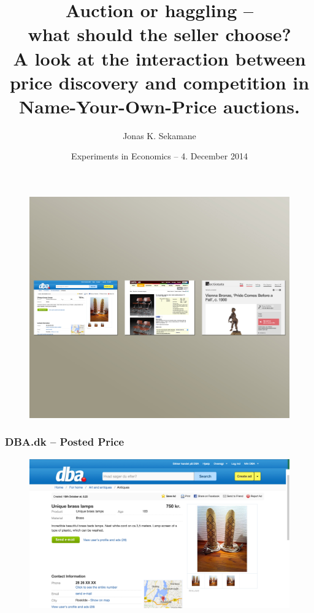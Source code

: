 \documentclass[mathserif,serif]{beamer}
\title[TITLE] %
{{\bf \LARGE Auction or haggling -- \\ what should the seller choose?} \\ \large A look at the interaction between price discovery and competition in Name-Your-Own-Price auctions.}
\subtitle{}
\author[Sekamane] %
{Jonas K. Sekamane}
\institute[] %
{}
\date[4 December 2014] %
{Experiments in Economics -- 4. December 2014}
\begin{document}
	\frame{\titlepage}
	
	\begin{frame}
		\frametitle{ }
		\vspace*{-15mm}
		\begin{figure}[plain]
			\hspace*{-11mm}
			\includegraphics[width=1\paperwidth]{Figures/Overview.jpg}
		\end{figure}
	\end{frame}
	
	\begin{frame}
		\frametitle{DBA.dk -- Posted Price}
		\begin{figure}[plain]
			\hspace*{-11mm}
			\includegraphics[width=1\paperwidth]{Figures/DBA_uk.jpg}
		\end{figure}
	\end{frame}
	
\end{document}
